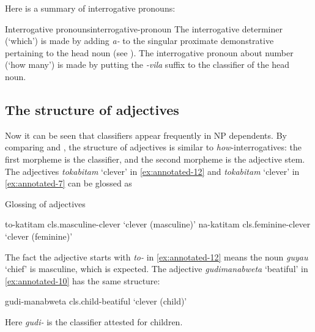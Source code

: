 \documentclass{article}
\newcommand*{\term}[1]{\emph{#1}}
\newcommand*{\corpus}[1]{\emph{#1}}
\newcommand{\translate}[1]{`#1'}
\def\\{}%
\begin{document}
Here is a summary of interrogative pronouns:
\begin{infobox}{Interrogative pronouns}{interrogative-pronoun}
    The interrogative determiner (\translate{which}) is made by adding \corpus{a-} 
    to the singular proximate demonstrative pertaining to the head noun
    (see ).
    The interrogative pronoun about number (\translate{how many}) is made by 
    putting the \corpus{-vila} suffix to the classifier of the head noun.
\end{infobox}

\subsection{The structure of adjectives}

Now it can be seen that classifiers appear frequently in NP dependents.
By comparing  and ,
the structure of adjectives is similar to \term{how}-interrogatives:
the first morpheme is the classifier, 
and the second morpheme is the adjective stem.
The adjectives \corpus{tokabitam} \translate{clever} in \eqref{ex:annotated-12}
and \corpus{tokabitam} \translate{clever} in \eqref{ex:annotated-7}
can be glossed as 
\begin{exe}
    \ex Glossing of adjectives
    \begin{xlist}
        \ex \gll to-katitam \\
        \acs{cls}.masculine-clever \\
        \glt \translate{clever (masculine)}
        \ex \gll na-katitam \\ 
        \acs{cls}.feminine-clever \\ 
        \glt \translate{clever (feminine)}
    \end{xlist}
\end{exe}
The fact the adjective starts with \corpus{to-} in \eqref{ex:annotated-12} means 
the noun \corpus{guyau} \translate{chief} is masculine,
which is expected.
The adjective \corpus{gudimanabweta} \translate{beatiful} in \eqref{ex:annotated-10}
has the same structure:
\begin{exe}
    \ex \gll gudi-manabweta \\
    \acs{cls}.child-beatiful \\ 
    \glt \translate{clever (child)}
\end{exe}
Here \corpus{gudi-} is the classifier attested for children.
\end{document}
